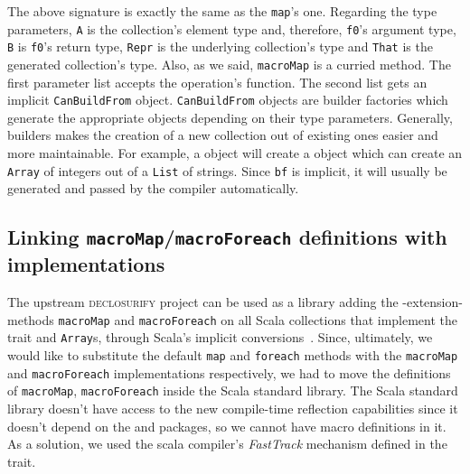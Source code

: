 The above signature is exactly the same as the \texttt{map}'s one. Regarding the
type parameters, \texttt{A} is the collection's element type and, therefore, \texttt{f0}'s
argument type, \texttt{B} is \texttt{f0}'s return type, \texttt{Repr} is the underlying collection's type
and \texttt{That} is the generated collection's type. Also, as we said, \texttt{macroMap} is a
curried method. The first parameter list accepts the operation's function. The
second list gets an implicit \texttt{CanBuildFrom} object. \texttt{CanBuildFrom} objects are
builder factories which generate the appropriate
 objects depending on their type parameters.
Generally, builders makes the creation of a new collection out of existing ones
easier and more maintainable. For example, a  object will create a  object which can
create an \texttt{Array} of integers out of a \texttt{List} of strings. Since \texttt{bf} is implicit, it
will usually be generated and passed by the compiler automatically.


\subsection{Linking \texttt{macroMap}/\texttt{macroForeach} definitions with implementations}
\label{ft_decl_std_lib}

The upstream \textsc{declosurify} project can be used as a library adding the -extension-
methods \texttt{macroMap} and \texttt{macroForeach} on all Scala collections that implement the
 trait and \texttt{Array}s, through Scala's implicit
conversions~\cite{oliveira_type_2010}. Since, ultimately, we would like to
substitute the default \texttt{map} and \texttt{foreach} methods with the \texttt{macroMap} and
\texttt{macroForeach} implementations respectively, we had to move the definitions
of \texttt{macroMap}, \texttt{macroForeach} inside the Scala standard library. The Scala standard
library doesn't have access to the new compile-time reflection capabilities
since it doesn't depend on the  and  packages, so we
cannot have macro definitions in it. As a solution, we used the scala compiler's
\emph{FastTrack} mechanism defined in the  trait.

